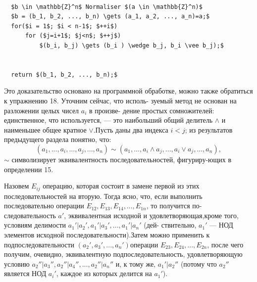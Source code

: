 \documentclass{mai_book}
\begin{document}
\begin{lstlisting}[mathescape=true]

  $b \in \mathbb{Z}^n$ Normaliser $(a \in \mathbb{Z}^n)$
  $b = (b_1, b_2, ..., b_n) \gets (a_1, a_2, ..., a_n)=a;$
  for($i = 1$; $i < n-1$; $++i$)
      for ($j=i+1$; $j<n$; $++j$)
          $(b_i, b_j) \gets (b_i ) \wedge b_j, b_i \vee b_j);$
      

  return $(b_1, b_2, ..., b_n);$

\end{lstlisting}
\begin{myproof}\linebreak
Это доказательство основано на программной обработке, можно \linebreak также обратиться к упражнению 18. Уточним сейчас, что исполь- \linebreak зуемый метод не основан на разложении целых чисел $a_i$ в произве- \linebreak дение простых сомножителей: единственное, что используется, --- \linebreak это наибольший общий делитель $\wedge$ и наименьшее общее кратное $\vee$.\linebreak Пусть даны два индекса $i < j$; из результатов предыдущего раздела \linebreak понятно, что:  
$$(a_1,...,a_i,...,a_j,...,a_n) \sim (a_1,...,a_i \wedge a_j,...,a_i \vee a_j,...,a_n),$$
$\sim$ символизирует эквивалентность последовательностей, фигуриру-\linebreak ющих в определении 15.  

\noindent Назовем $E_{ij}$ операцию, которая состоит в замене первой из этих \linebreak последовательностей на вторую. Тогда ясно, что, если выполнить \linebreak последовательно операции $E_{12}, E_{13}, E_{14}, ..., E_{1n}$, то получится по- \linebreak следовательность $a'$, эквивалентная исходной и удовлетворяющая,\linebreak кроме того, условиям делимости $a_1'|a_2', a_1'|a_3', ..., a_1'|a_n'$ (дей- \linebreak ствительно, $a_1'$ --- НОД элементов исходной последовательности).\linebreak Затем можно применить к подпоследовательности $(a_2', a_3',..., a_n')$\linebreak операции $E_{23}, E_{24}, ..., E_{2n}$, после чего получим, очевидно, \linebreak эквивалентную подпоследовательность, удовлетворяющую условию \linebreak $a_2''|a_3'', a_2''|a_4'', ..., a_2''|a_n''$ и, к тому же, $a_1'|a_2''$ (потому что $a_2''$ \linebreak является НОД $a_i'$, каждое из которых делится на $a_1'$).  \newpage


\end{myproof}
\end{document}
